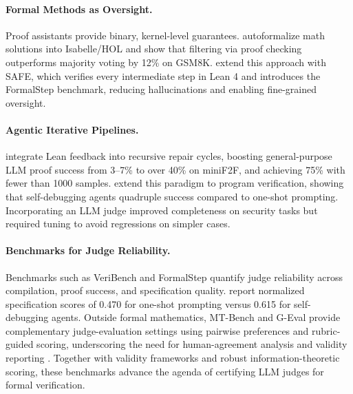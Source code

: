 \documentclass[numbers]{article}
\begin{document}
\paragraph{Formal Methods as Oversight.}
Proof assistants provide binary, kernel-level guarantees. \citet{zhou2024donttrustverify} autoformalize math solutions into Isabelle/HOL and show that filtering via proof checking outperforms majority voting by 12\% on GSM8K. \citet{liu2025safe} extend this approach with SAFE, which verifies every intermediate step in Lean 4 and introduces the FormalStep benchmark, reducing hallucinations and enabling fine-grained oversight.

\paragraph{Agentic Iterative Pipelines.}
\citet{ospanov2023apollo} integrate Lean feedback into recursive repair cycles, boosting general-purpose LLM proof success from 3--7\% to over 40\% on miniF2F, and achieving 75\% with fewer than 1000 samples. \citet{miranda2025veribench} extend this paradigm to program verification, showing that self-debugging agents quadruple success compared to one-shot prompting.
Incorporating an LLM judge improved completeness on security tasks but required tuning to avoid regressions on simpler cases.

\paragraph{Benchmarks for Judge Reliability.}
Benchmarks such as VeriBench and FormalStep quantify judge reliability across compilation, proof success, and specification quality.
\citet{miranda2025veribench} report normalized specification scores of 0.470 for one-shot prompting versus 0.615 for self-debugging agents.
Outside formal mathematics, MT-Bench and G-Eval provide complementary judge-evaluation settings using pairwise preferences and rubric-guided scoring, underscoring the need for human-agreement analysis and validity reporting \citep{Zheng2023MTBench,Liu2023GEval}.
Together with validity frameworks and robust information-theoretic scoring, these benchmarks advance the agenda of certifying LLM judges for formal verification.

\end{document}

